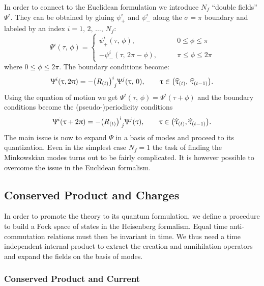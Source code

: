 In order to connect to the Euclidean formulation we introduce $N_f$ ``double fields'' $\Psi^i$.\footnotemark{}
They can be obtained by gluing $\psi^i_+$ and $\psi^i_-$ along the $\sigma = \pi$ boundary and labeled by an index $i = 1,\, 2,\, \dots,\, N_f$:
\begin{equation}
  \Psi^i(\tau,\, \phi)
  =
  \begin{cases}
    \psi^i_+(\tau,\, \phi),
    & \qquad 0\le\phi\le \pi
    \\
    -\psi^i_-(\tau,\, 2\pi-\phi),
    & \qquad \pi \le \phi \le 2 \pi        
  \end{cases}
  \label{eq:double-field-Lorentzian}
\end{equation}
where $0 \le \phi \le 2 \pi$.
The boundary conditions become:
\begin{equation}
  \Psi^i(\tau, 2 \pi )
  =
  - \tensor{\qty( R_{(t)} )}{^i_j}
  \Psi^j(\tau,\, 0 ),
  \qquad
  \tau \in \qty( \htau_{(t)},\, \htau_{(t-1)} ).
\end{equation}
Using the equation of motion we get $\Psi^i(\tau,\, \phi) = \Psi^i(\tau + \phi)$ and the boundary conditions become the (pseudo-)periodicity conditions
\begin{equation}
  \Psi^i(\tau + 2 \pi )
  =
  - \tensor{\qty( R_{(t)} )}{^i_j}
  \Psi^j(\tau ),
  \qquad
  \tau \in \qty( \htau_{(t)}, \htau_{(t-1)} ).
\end{equation}
The main issue is now to expand $\Psi$ in a basis of modes and proceed to its quantization.
Even in the simplest case $N_f = 1$ the task of finding the Minkowskian modes turns out to be fairly complicated.
It is however possible to overcome the issue in the Euclidean formalism.


\subsection{Conserved Product and Charges}
\label{sec:product}

In order to promote the theory to its quantum formulation, we define a procedure to build a Fock space of states in the Heisenberg formalism.
Equal time anti-commutation relations must then be invariant in time.
We thus need a time independent internal product to extract the creation and annihilation operators and expand the fields on the basis of modes.


\subsubsection{Conserved Product and Current}

